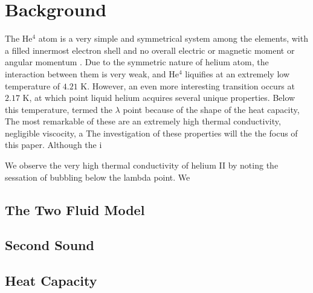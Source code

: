 
\section{Background}\label{background}

The He$^4$ atom is a very simple and symmetrical system among the
elements, with a filled innermost electron shell and no overall
electric or magnetic moment or angular momentum \cite{atkins}. Due to
the symmetric nature of helium atom, the interaction between them is
very weak, and He$^4$ liquifies at an extremely low temperature of
$4.21$ K. However, an even more interesting transition occurs at
$2.17$ K, at which point liquid helium acquires several unique
properties. Below this temperature, termed the $\lambda$ point because
of the shape of the heat capacity, The most remarkable of these are an extremely high
thermal conductivity, negligible viscocity, a The investigation of
these properties will the the focus of this paper. Although the i


We observe the very high thermal conductivity of helium II by noting
the sessation of bubbling below the lambda point. We

\subsection{The Two Fluid Model}
\subsection{Second Sound}
\subsection{Heat Capacity}
